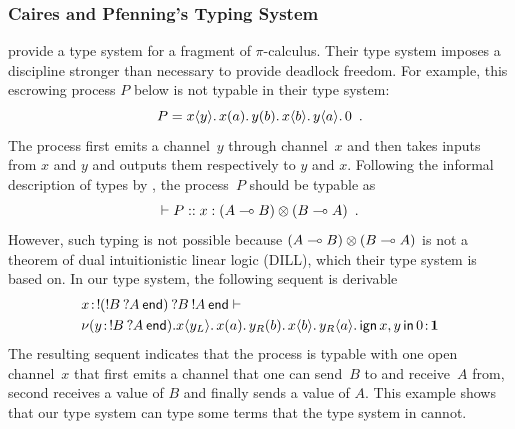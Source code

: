 \subsubsection{Caires and Pfenning's Typing System}
\label{pfenning}

\citet{pfenning2010} provide a type system for a fragment of $\pi$-calculus.
Their type system imposes a discipline stronger
than necessary to provide deadlock freedom.
For example, this escrowing process $P$ below is not typable in their type
system:
\[
 P = {x}\langle{y}\rangle.\,{{{x}({a}).\,{{{y}({b}).\,{{x}\langle{b}\rangle.\,{{y}\langle{a}\rangle.\,{0}}}}}}}\enspace.
\]
The process first emits a channel~$y$ through channel~$x$ and then
takes inputs from $x$ and $y$ and outputs them respectively to $y$ and $x$.
Following the informal description of types by \citet{pfenning2010},
the process~$P$ should be typable as
\[
 \vdash P::x:(A\multimap B)\otimes(B\multimap A)\enspace.
\]
However, such typing is not possible because $(A\multimap B)\otimes (B\multimap
A)$ is not a theorem of dual intuitionistic linear logic (DILL), which
their type system
is based on.
In our type system, the following sequent is derivable
\begin{align*}
&
{x} \mathord{\colon\kern -2pt}{\mathop{!}\kern -2pt{(\mathop{!}\kern -2pt{B}\hskip 2pt{\mathop{?}\kern -2pt{A}\hskip 2pt{\mathsf{end}}})}\hskip 2pt{\mathop{?}\kern -2pt{B}\hskip 2pt{\mathop{!}\kern -2pt{A}\hskip 2pt{\mathsf{end}}}}}
\vdash\\
&{
\nu({y} \mathord{\colon\kern -2pt}{\mathop{!}\kern -2pt{B}\hskip 2pt{\mathop{?}\kern -2pt{A}\hskip 2pt{\mathsf{end}}}}).
{{x}\langle{y_L}\rangle.\,{{{x}({a}).\,{{{y_R}({b}).\,{{x}\langle{b}\rangle.\,{{y_R}\langle{a}\rangle.\,{\mathsf{ign }\,{x,y}\,\mathsf{ in }\,{0}}}}}}}}}
} \mathord{\colon\kern -2pt}{\mathbf{1}}
\end{align*}
The resulting sequent indicates that the process is typable with one
open channel~$x$ that first emits
a channel that one can send~$B$ to and receive~$A$ from, second receives a
value of $B$ and
finally sends a value of $A$.
This example shows that our type system can type some terms that
the type system in \citet{pfenning2010} cannot.

